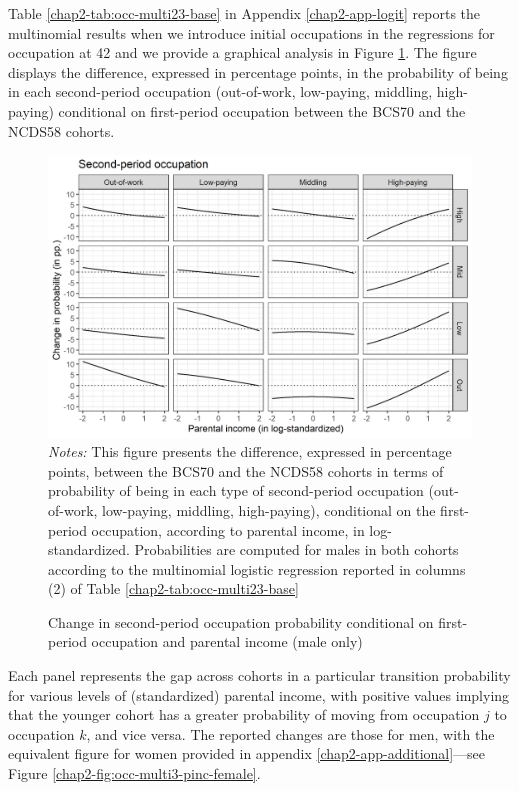 Table \ref{chap2-tab:occ-multi23-base} in Appendix \ref{chap2-app-logit} reports the multinomial results when we introduce initial occupations in the regressions for occupation at 42 and we provide a graphical analysis in Figure \ref{chap2-fig:occ-multi3-pinc-male}. The figure displays the difference, expressed in percentage points, in the probability of being in each second-period occupation (out-of-work, low-paying, middling, high-paying) conditional on first-period occupation between the BCS70 and the NCDS58 cohorts. 
\begin{figure}[!tb]
    \centering
    \caption{Change in second-period occupation probability conditional on first-period occupation and parental income (male only)}
    \label{chap2-fig:occ-multi3-pinc-male}
    \includegraphics[width=\linewidth]{chap2/graphic/occ-multi3-pinc-male.png}
    \vspace{-3em}
    \justify\singlespacing\footnotesize{\textit{Notes:} This figure presents the difference, expressed in percentage points, between the BCS70 and the NCDS58 cohorts in terms of probability of being in each type of second-period occupation (out-of-work, low-paying, middling, high-paying), conditional on the first-period occupation, according to parental income, in log-standardized.
    Probabilities are computed for males in both cohorts according to the multinomial logistic regression reported in columns (2) of Table \ref{chap2-tab:occ-multi23-base}}
\end{figure}
Each panel represents the gap across cohorts in a particular transition probability for various levels of (standardized) parental income, with positive values implying that the younger cohort has a greater probability of moving from occupation $j$ to occupation $k$, and vice versa. The reported changes are those for men, with the equivalent figure for women provided in appendix \ref{chap2-app-additional}---see Figure \ref{chap2-fig:occ-multi3-pinc-female}.

